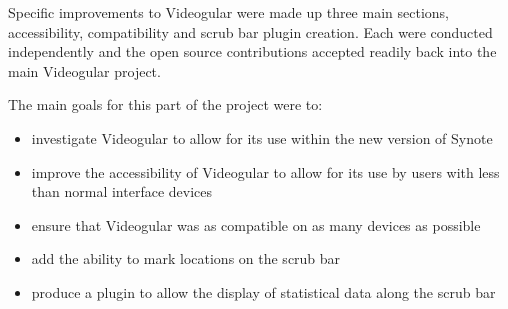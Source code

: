 Specific improvements to \gls{Videogular} were made up three main sections, accessibility, compatibility and scrub bar plugin creation. Each were conducted independently and the open source contributions accepted readily back into the main \gls{Videogular} project.

The main goals for this part of the project were to:
\begin{itemize}
\item investigate \gls{Videogular} to allow for its use within the new version of Synote
\item improve the accessibility of \gls{Videogular} to allow for its use by users with less than normal interface  devices
\item ensure that \gls{Videogular} was as compatible on as many devices as possible
\item add the ability to mark locations on the scrub bar
\item produce a plugin to allow the display of statistical data along the scrub bar
\end{itemize}